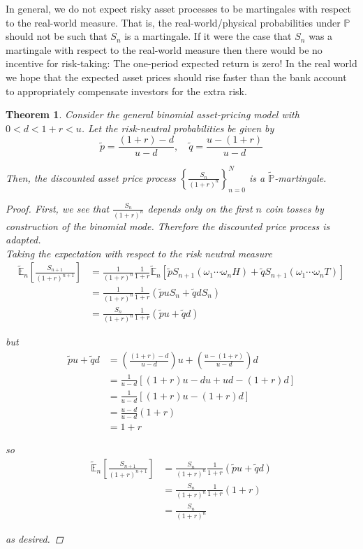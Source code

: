 \documentclass[12pt]{article}
\newtheorem{theorem}{Theorem}
\newlength\tindent
\renewcommand{\indent}{\hspace*{\tindent}}
\renewcommand{\P}{\mathbb P}
\newcommand{\E}{\mathbb E}
\begin{document}
\indent In general, we do not expect risky asset processes to be martingales with respect to the real-world measure. That is, the real-world/physical probabilities under $\P$ should not be such that $S_n$ is a martingale. If it were the case that $S_n$ was a martingale with respect to the real-world measure then there would be no incentive for risk-taking: The one-period expected return is zero! In the real world we hope that the expected asset prices should rise faster than the bank account to appropriately compensate investors for the extra risk.

\begin{theorem} Consider the general binomial asset-pricing model with $0 < d < 1 + r < u$. Let the risk-neutral probabilities be given by
\begin{equation*}
	\tilde{p} = \frac{(1 + r) - d}{u - d}, \quad \tilde{q} = \frac{u - (1 + r)}{u - d}
\end{equation*}

Then, the discounted asset price process $\left\{ \frac{ S_n }{(1 + r)^n} \right\}_{n = 0}^N$ is a $\tilde{\P}$-martingale.

\begin{proof} First, we see that $\frac{S_n}{(1 + r)^n}$ depends only on the first $n$ coin tosses by construction of the binomial mode. Therefore the discounted price process is adapted. \\

Taking the expectation with respect to the risk neutral measure
\begin{align*}
	\tilde{\E}_n\left[ \frac{S_{n + 1}}{(1 + r)^{n + 1}} \right] &= \frac{1}{(1 + r)^n}\frac{1}{1 + r} \tilde{\E}_n [\tilde{p}S_{n + 1}(\omega_1\cdots\omega_n H) + \tilde{q}S_{n + 1}(\omega_1 \cdots \omega_n T)] \\
	&= \frac{1}{(1 + r)^n}\frac{1}{1 + r} (\tilde{p} uS_n + \tilde{q} d S_n) \\
	&= \frac{S_n}{(1 + r)^n}\frac{1}{1 + r} (\tilde{p} u + \tilde{q} d)	
\end{align*}

but
\begin{align*}
	\tilde{p}u + \tilde{q}d &= \left(\frac{(1 + r) - d}{u - d}\right)u + \left(\frac{u - (1 + r)}{u - d}\right)d \\
	&= \frac{1}{u - d} \left[(1 + r)u - du + ud - (1 + r)d \right] \\
	&= \frac{1}{u - d} \left[(1 + r)u - (1 + r)d \right] \\
	&= \frac{u - d}{u - d}(1 + r) \\
	&= 1 + r
\end{align*} 

so
\begin{align*}
\tilde{\E}_n\left[ \frac{S_{n + 1}}{(1 + r)^{n + 1}} \right] &= \frac{S_n}{(1 + r)^n}\frac{1}{1 + r} (\tilde{p} u + \tilde{q} d) \\
	&= \frac{S_n}{(1 + r)^n} \frac{1}{1 + r}(1 + r) \\
	&= \frac{S_n}{(1 + r)^n}
\end{align*}

as desired.
\end{proof}
\end{theorem}
\end{document}
